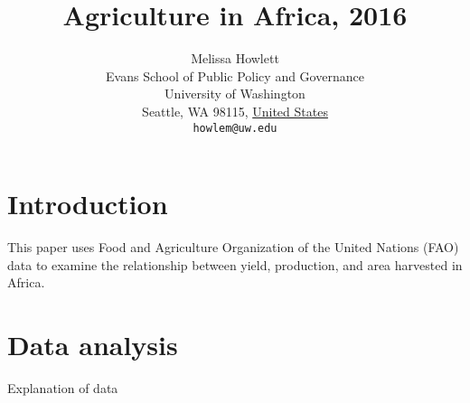 \documentclass{article}
\title{Agriculture in Africa, 2016}
\author{
        Melissa Howlett\\
        Evans School of Public Policy and Governance\\
        University of Washington\\
        Seattle, WA 98115, \underline{United States}\\
        \texttt{howlem@uw.edu}
}
\begin{document}

\maketitle

\section{Introduction}\label{intro}
This paper uses Food and Agriculture Organization of the United Nations (FAO) data to examine the relationship between yield, production, and area harvested in Africa.

\section{Data analysis}\label{datas}
Explanation of data
\end{document}
